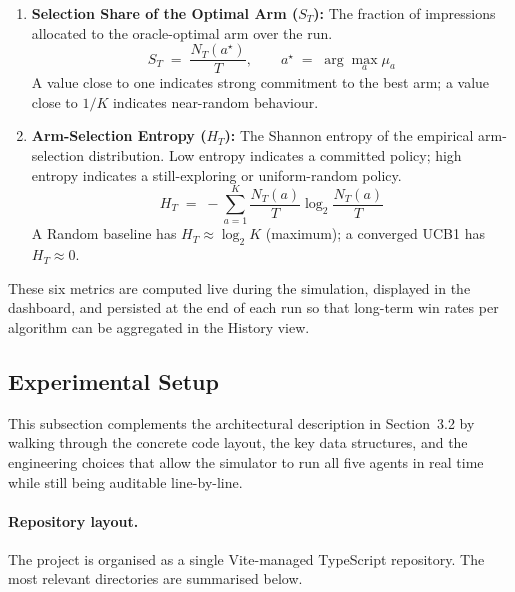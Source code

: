 \begin{enumerate}
\item \textbf{Selection Share of the Optimal Arm ($S_T$):} The fraction of impressions allocated to the oracle-optimal arm over the run.
\begin{equation}
S_T \;=\; \frac{N_T(a^\star)}{T}, \qquad a^\star \;=\; \arg\max_a \mu_a
\label{eq:share}
\end{equation}
A value close to one indicates strong commitment to the best arm; a value close to $1/K$ indicates near-random behaviour.

\item \textbf{Arm-Selection Entropy ($H_T$):} The Shannon entropy of the empirical arm-selection distribution. Low entropy indicates a committed policy; high entropy indicates a still-exploring or uniform-random policy.
\begin{equation}
H_T \;=\; -\sum_{a=1}^{K} \frac{N_T(a)}{T} \log_2 \frac{N_T(a)}{T}
\label{eq:entropy}
\end{equation}
A Random baseline has $H_T \approx \log_2 K$ (maximum); a converged UCB1 has $H_T \approx 0$.
\end{enumerate}

These six metrics are computed live during the simulation, displayed in the dashboard, and persisted at the end of each run so that long-term win rates per algorithm can be aggregated in the History view.

\subsection{Experimental Setup}
This subsection complements the architectural description in Section~3.2 by walking through the concrete code layout, the key data structures, and the engineering choices that allow the simulator to run all five agents in real time while still being auditable line-by-line.

\paragraph{Repository layout.}
The project is organised as a single Vite-managed TypeScript repository. The most relevant directories are summarised below.

